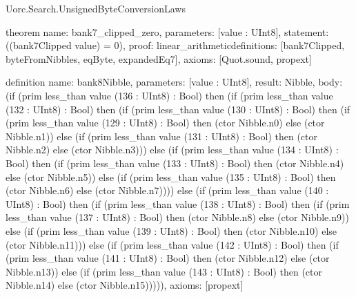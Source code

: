 \begin{lexlean}{Uorc.Search.UnsignedByteConversionLaws}
\begin{semanticmodule}
theorem{
  name: bank7_clipped_zero,
  parameters: [value : UInt8],
  statement: ((bank7Clipped value) = 0),
  proof: linear_arithmetic{definitions: [bank7Clipped, byteFromNibbles, eqByte, expandedEq7]},
  axioms: [Quot.sound, propext]
}

definition{
  name: bank8Nibble,
  parameters: [value : UInt8],
  result: Nibble,
  body: (if (prim less_than value (136 : UInt8) : Bool) then (if (prim less_than value (132 : UInt8) : Bool) then (if (prim less_than value (130 : UInt8) : Bool) then (if (prim less_than value (129 : UInt8) : Bool) then (ctor Nibble.n0) else (ctor Nibble.n1)) else (if (prim less_than value (131 : UInt8) : Bool) then (ctor Nibble.n2) else (ctor Nibble.n3))) else (if (prim less_than value (134 : UInt8) : Bool) then (if (prim less_than value (133 : UInt8) : Bool) then (ctor Nibble.n4) else (ctor Nibble.n5)) else (if (prim less_than value (135 : UInt8) : Bool) then (ctor Nibble.n6) else (ctor Nibble.n7)))) else (if (prim less_than value (140 : UInt8) : Bool) then (if (prim less_than value (138 : UInt8) : Bool) then (if (prim less_than value (137 : UInt8) : Bool) then (ctor Nibble.n8) else (ctor Nibble.n9)) else (if (prim less_than value (139 : UInt8) : Bool) then (ctor Nibble.n10) else (ctor Nibble.n11))) else (if (prim less_than value (142 : UInt8) : Bool) then (if (prim less_than value (141 : UInt8) : Bool) then (ctor Nibble.n12) else (ctor Nibble.n13)) else (if (prim less_than value (143 : UInt8) : Bool) then (ctor Nibble.n14) else (ctor Nibble.n15))))),
  axioms: [propext]
}


\end{semanticmodule}
\end{lexlean}
